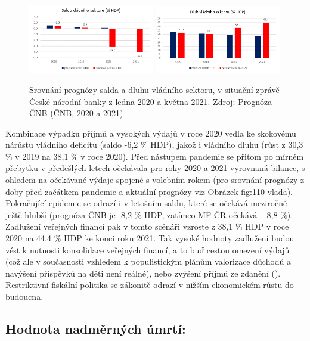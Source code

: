 \begin{figure}[ht]
    \centering
    \includegraphics[width=0.49\textwidth]{./pic/saldo.png} \includegraphics[width=0.49\textwidth]{./pic/dluh.png}
    \caption{Srovnání prognózy salda a dluhu vládního sektoru, v situační zprávě České národní banky z ledna 2020 a května 2021. Zdroj: Prognóza ČNB (ČNB, 2020 a 2021)}
    \label{fig:110-vlada}
\end{figure}

Kombinace výpadku příjmů a vysokých výdajů v roce 2020 vedla ke skokovému nárůstu vládního deficitu (saldo -6,2 \% HDP), jakož i vládního dluhu (růst z 30,3 \% v 2019 na 38,1 \% v roce 2020). Před nástupem pandemie se přitom po mírném přebytku v předešlých letech očekávala pro roky 2020 a 2021 vyrovnaná bilance, s ohledem na očekávané výdaje spojené s volebním rokem (pro srovnání prognózy z doby před začátkem pandemie a aktuální prognózy viz Obrázek fig:110-vlada). Pokračující epidemie se odrazí i v letošním saldu, které se očekává meziročně ještě hlubší (prognóza ČNB je -8,2 \% HDP, zatímco MF ČR očekává – 8,8 \%). Zadlužení veřejných financí pak v tomto scénáři vzroste z 38,1 \% HDP v roce 2020 na 44,4 \% HDP ke konci roku 2021. Tak vysoké hodnoty zadlužení budou vést k nutnosti konsolidace veřejných financí, a to buď cestou omezení výdajů (což ale v současnosti vzhledem k populistickým plánům valorizace důchodů a navýšení příspěvků na děti není reálné), nebo zvýšení příjmů ze zdanění (\cite{NRR2021}). Restriktivní fiskální politika se zákonitě odrazí v nižším ekonomickém růstu do budoucna.

\subsection*{Hodnota nadměrných úmrtí:} 

